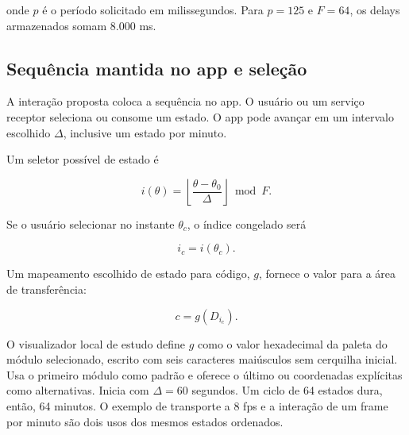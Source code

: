 \documentclass[
  11pt,
  a4paper,
]{article}
\begin{document}
onde \(p\) é o período solicitado em milissegundos. Para \(p=125\) e
\(F=64\), os delays armazenados somam 8.000 ms.

\hypertarget{sequuxeancia-mantida-no-app-e-seleuxe7uxe3o}{%
\subsection{Sequência mantida no app e
seleção}\label{sequuxeancia-mantida-no-app-e-seleuxe7uxe3o}}

A interação proposta coloca a sequência no app. O usuário ou um serviço
receptor seleciona ou consome um estado. O app pode avançar em um
intervalo escolhido \(\Delta\), inclusive um estado por minuto.

Um seletor possível de estado é

\[
i(\theta)=
\left\lfloor\frac{\theta-\theta_0}{\Delta}\right\rfloor\bmod F.
\]

Se o usuário selecionar no instante \(\theta_c\), o índice congelado
será

\[
i_c=i(\theta_c).
\]

Um mapeamento escolhido de estado para código, \(g\), fornece o valor
para a área de transferência:

\[
c=g(D_{i_c}).
\]

O visualizador local de estudo define \(g\) como o valor hexadecimal da
paleta do módulo selecionado, escrito com seis caracteres maiúsculos sem
cerquilha inicial. Usa o primeiro módulo como padrão e oferece o último
ou coordenadas explícitas como alternativas. Inicia com \(\Delta=60\)
segundos. Um ciclo de 64 estados dura, então, 64 minutos. O exemplo de
transporte a 8 fps e a interação de um frame por minuto são dois usos
dos mesmos estados ordenados.
\end{document}
